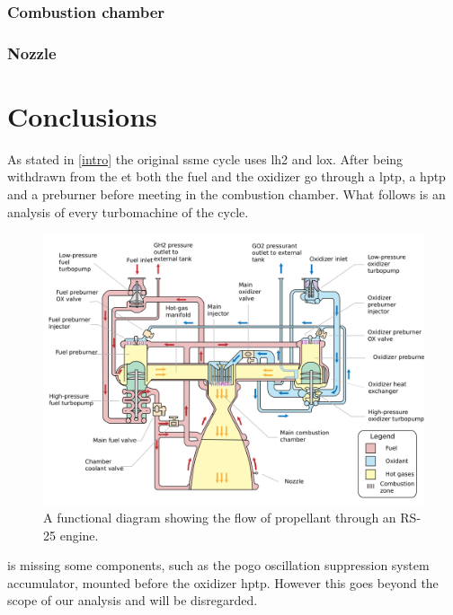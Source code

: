 \subsubsection{Combustion chamber}
\subsubsection{Nozzle}

\section{Conclusions}




As stated in \cref{intro} the original \acrshort{ssme} cycle uses \acrlong{lh2} and \acrlong{lox}. After being withdrawn from the \acrfull{et} both the fuel and the oxidizer go through a \acrfull{lptp}, a \acrfull{hptp} and a preburner before meeting in the combustion chamber. What follows is an analysis of every turbomachine of the cycle.
\begin{figure}
	\centering
 \includegraphics[width=.75\textwidth]{ssme_ciclo}
	\caption{A functional diagram showing the flow of propellant through an RS-25 engine.}
	\label{fig:ssme_cycle}
\end{figure}
 is missing some components, such as the pogo oscillation suppression system accumulator, mounted before the oxidizer \acrshort{hptp}. However this goes beyond the scope of our analysis and will be disregarded.
 
